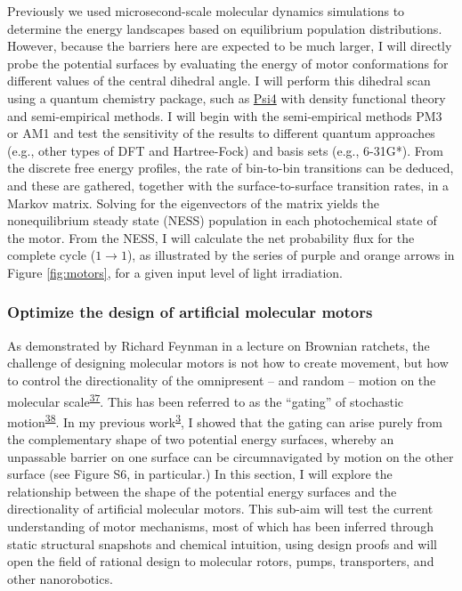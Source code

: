 \documentclass[11pt,notitlepage]{article}
\begin{document}
Previously we used microsecond-scale molecular dynamics simulations to
determine the energy landscapes based on equilibrium population
distributions. However, because the barriers here are expected to be
much larger, I will directly probe the potential surfaces by evaluating
the energy of motor conformations for different values of the central
dihedral angle. I will perform this dihedral scan using a quantum
chemistry package, such as \href{http://psicode.org/}{Psi4} with density
functional theory and semi-empirical methods. I will begin with the
semi-empirical methods PM3 or AM1 and test the sensitivity of the
results to different quantum approaches (e.g., other types of DFT and
Hartree-Fock) and basis sets (e.g., 6-31G*). From the discrete free
energy profiles, the rate of bin-to-bin transitions can be deduced, and
these are gathered, together with the surface-to-surface transition
rates, in a Markov matrix. Solving for the eigenvectors of the matrix
yields the nonequilibrium steady state (NESS) population in each
photochemical state of the motor. From the NESS, I will calculate the
net probability flux for the complete cycle (\(1 \rightarrow 1\)), as
illustrated by the series of purple and orange arrows in Figure
\ref{fig:motors}, for a given input level of light irradiation.

\hypertarget{optimize-the-design-of-artificial-molecular-motors}{%
\subsubsection{Optimize the design of artificial molecular
motors}\label{optimize-the-design-of-artificial-molecular-motors}}

As demonstrated by Richard Feynman in a lecture on Brownian ratchets,
the challenge of designing molecular motors is not how to create
movement, but how to control the directionality of the omnipresent --
and random -- motion on the molecular
scale\textsuperscript{\protect\hyperlink{ref-10FsKpWBI}{37}}. This has
been referred to as the ``gating'' of stochastic
motion\textsuperscript{\protect\hyperlink{ref-qhUBHBOM}{38}}. In my
previous work\textsuperscript{\protect\hyperlink{ref-1BfYw0gk2}{3}}, I
showed that the gating can arise purely from the complementary shape of
two potential energy surfaces, whereby an unpassable barrier on one
surface can be circumnavigated by motion on the other surface (see
Figure S6, in particular.) In this section, I will explore the
relationship between the shape of the potential energy surfaces and the
directionality of artificial molecular motors. This sub-aim will test
the current understanding of motor mechanisms, most of which has been
inferred through static structural snapshots and chemical intuition,
using design proofs and will open the field of rational design to
molecular rotors, pumps, transporters, and other nanorobotics.
\end{document}

